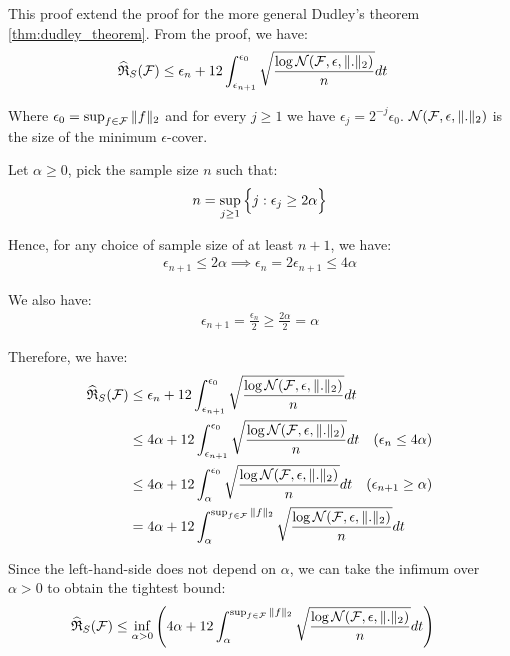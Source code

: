 \begin{proof*}
    This proof extend the proof for the more general Dudley's theorem \ref{thm:dudley_theorem}. From the proof, we have:
    \begin{align*}
        \widehat{\mathfrak{R}}_S(\mathcal{F}) &\le \epsilon_n + 12 \int_{\epsilon_{n+1}}^{\epsilon_0} \sqrt{
            \frac{\log\mathcal{N}(\mathcal{F}, \epsilon, \|.\|_2)}{n}
        }dt
    \end{align*}

    \noindent Where $\epsilon_0=\sup_{f\in\mathcal{F}}\|f\|_2$ and for every $j\ge1$ we have $\epsilon_j = 2^{-j}\epsilon_0$. $\mathcal{N}(\mathcal{F}, \epsilon, \|.\|_2)$ is the size of the minimum $\epsilon$-cover.

    \noindent\newline Let $\alpha\ge0$, pick the sample size $n$ such that:
    \begin{align*}
        n = \sup_{j\ge1} \Big\{ j : \epsilon_j \ge 2\alpha \Big\}
    \end{align*}

    \noindent Hence, for any choice of sample size of at least $n+1$, we have:
    \begin{align*}
        \epsilon_{n+1} \le 2\alpha \implies \epsilon_n = 2\epsilon_{n+1} \le 4\alpha
    \end{align*}

    \noindent We also have:
    \begin{align*}
        \epsilon_{n+1} = \frac{\epsilon_n}{2} \ge \frac{2\alpha}{2} = \alpha
    \end{align*}

    \noindent Therefore, we have:
    \begin{align*}
        \widehat{\mathfrak{R}}_S(\mathcal{F}) &\le \epsilon_n + 12 \int_{\epsilon_{n+1}}^{\epsilon_0} \sqrt{
            \frac{\log\mathcal{N}(\mathcal{F}, \epsilon, \|.\|_2)}{n}
        }dt \\
        &\le 4\alpha + 12 \int_{\epsilon_{n+1}}^{\epsilon_0} \sqrt{
            \frac{\log\mathcal{N}(\mathcal{F}, \epsilon, \|.\|_2)}{n}
        }dt \ \ \ (\epsilon_n \le 4\alpha) \\
        &\le 4\alpha + 12 \int_{\alpha}^{\epsilon_0} \sqrt{
            \frac{\log\mathcal{N}(\mathcal{F}, \epsilon, \|.\|_2)}{n}
        }dt \ \ \ (\epsilon_{n+1} \ge \alpha) \\
        &=  4\alpha + 12 \int_{\alpha}^{\sup_{f\in\mathcal{F}}\|f\|_2} \sqrt{
            \frac{\log\mathcal{N}(\mathcal{F}, \epsilon, \|.\|_2)}{n}
        }dt 
    \end{align*}

    \noindent Since the left-hand-side does not depend on $\alpha$, we can take the infimum over $\alpha>0$ to obtain the tightest bound:
    \begin{align*}
        \widehat{\mathfrak{R}}_S(\mathcal{F}) &\le \inf_{\alpha>0}\Bigg( 
            4\alpha + 12 \int_{\alpha}^{\sup_{f\in\mathcal{F}}\|f\|_2} \sqrt{
                \frac{\log\mathcal{N}(\mathcal{F}, \epsilon, \|.\|_2)}{n}
            }dt 
         \Bigg)
    \end{align*}
\end{proof*}

